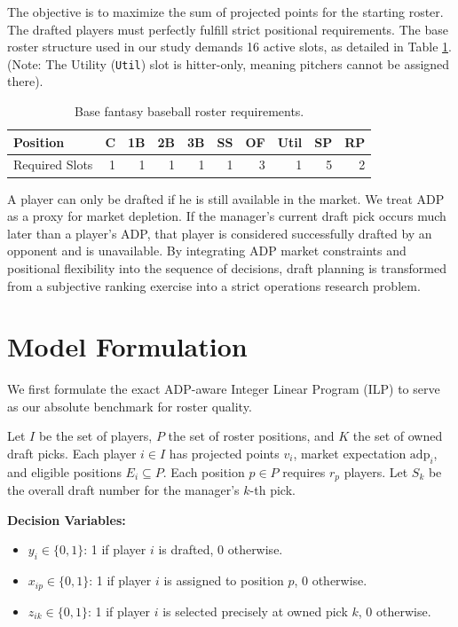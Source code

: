 \documentclass[11pt,a4paper]{article}
\begin{document}
The objective is to maximize the sum of projected points for the starting roster. The drafted players must perfectly fulfill strict positional requirements. The base roster structure used in our study demands 16 active slots, as detailed in Table \ref{tab:roster}. (Note: The Utility (\texttt{Util}) slot is hitter-only, meaning pitchers cannot be assigned there).

\begin{table}[H]
\centering
\caption{Base fantasy baseball roster requirements.}
\label{tab:roster}
\begin{tabular}{lrrrrrrrrr}
\toprule
Position & C & 1B & 2B & 3B & SS & OF & Util & SP & RP \\
\midrule
Required Slots & 1 & 1 & 1 & 1 & 1 & 3 & 1 & 5 & 2 \\
\bottomrule
\end{tabular}
\end{table}

A player can only be drafted if he is still available in the market. We treat ADP as a proxy for market depletion. If the manager's current draft pick occurs much later than a player's ADP, that player is considered successfully drafted by an opponent and is unavailable. By integrating ADP market constraints and positional flexibility into the sequence of decisions, draft planning is transformed from a subjective ranking exercise into a strict operations research problem.

\section{Model Formulation}

We first formulate the exact ADP-aware Integer Linear Program (ILP) to serve as our absolute benchmark for roster quality. 

Let $I$ be the set of players, $P$ the set of roster positions, and $K$ the set of owned draft picks. Each player $i \in I$ has projected points $v_i$, market expectation $\text{adp}_i$, and eligible positions $E_i \subseteq P$. Each position $p \in P$ requires $r_p$ players. Let $S_k$ be the overall draft number for the manager's $k$-th pick.

\textbf{Decision Variables:}
\begin{itemize}[leftmargin=1.5em]
  \item $y_i \in \{0,1\}$: 1 if player $i$ is drafted, 0 otherwise.
  \item $x_{ip} \in \{0,1\}$: 1 if player $i$ is assigned to position $p$, 0 otherwise.
  \item $z_{ik} \in \{0,1\}$: 1 if player $i$ is selected precisely at owned pick $k$, 0 otherwise.
\end{itemize}
\end{document}
